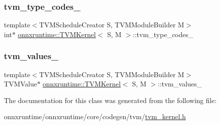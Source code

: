 \mbox{\label{classonnxruntime_1_1TVMKernel_a64022db7464ce469edccf37356779a54}} 
\subsubsection{\texorpdfstring{tvm\+\_\+type\+\_\+codes\+\_\+}{tvm\_type\_codes\_}}
{\footnotesize\ttfamily template$<$T\+V\+M\+Schedule\+Creator S, T\+V\+M\+Module\+Builder M$>$ \\
int$\ast$ \mbox{\hyperlink{classonnxruntime_1_1TVMKernel}{onnxruntime\+::\+T\+V\+M\+Kernel}}$<$ S, M $>$\+::tvm\+\_\+type\+\_\+codes\+\_\+\hspace{0.3cm}{\ttfamily [protected]}}

\mbox{\label{classonnxruntime_1_1TVMKernel_af7810d51459fdd5969b1aaac3237b707}} 
\subsubsection{\texorpdfstring{tvm\+\_\+values\+\_\+}{tvm\_values\_}}
{\footnotesize\ttfamily template$<$T\+V\+M\+Schedule\+Creator S, T\+V\+M\+Module\+Builder M$>$ \\
T\+V\+M\+Value$\ast$ \mbox{\hyperlink{classonnxruntime_1_1TVMKernel}{onnxruntime\+::\+T\+V\+M\+Kernel}}$<$ S, M $>$\+::tvm\+\_\+values\+\_\+\hspace{0.3cm}{\ttfamily [protected]}}



The documentation for this class was generated from the following file\+:\begin{DoxyCompactItemize}
\item 
onnxruntime/onnxruntime/core/codegen/tvm/\mbox{\hyperlink{tvm__kernel_8h}{tvm\+\_\+kernel.\+h}}\end{DoxyCompactItemize}
